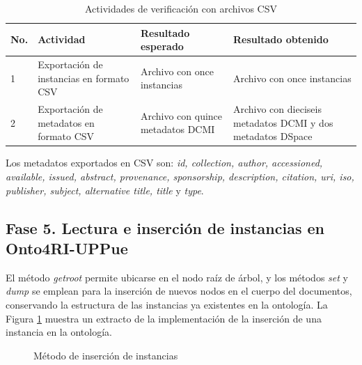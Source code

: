 \begin{table}[htbp]
    \begin{center}
    \caption{Actividades de verificaci\'on con archivos CSV}
    \begin{tabular}{| p{1.5cm}| p{3.5cm} | p{3.5cm} | p{3.5cm} |}
    \hline
    \centering \textbf{No. } & \textbf{Actividad} & \textbf{Resultado esperado} & \textbf{Resultado obtenido} \\
    \hline \hline
    1 & Exportaci\'on de instancias en formato CSV & Archivo con once instancias & Archivo con once instancias  \\ \hline
    2 & Exportaci\'on de metadatos en formato CSV  & Archivo con quince metadatos DCMI & Archivo con dieciseis metadatos DCMI y dos metadatos DSpace \\ \hline
    \end{tabular}
    \label{casosPruebaInstancias}
    \end{center}
\end{table}

Los metadatos exportados en CSV son: \textit{id, collection, author, accessioned, available, issued, abstract, provenance, sponsorship, description, citation, uri, iso, publisher, subject, alternative title, title} y \textit{type}.\newline

\subsection{Fase 5. Lectura e inserci\'on de instancias en Onto4RI-UPPue}

El m\'etodo \textit{getroot} permite ubicarse en el nodo ra\'iz de \'arbol, y los m\'etodos \textit{set} y \textit{dump} se emplean para la inserci\'on de nuevos nodos en el cuerpo del documentos, conservando la estructura de las instancias ya existentes en la ontolog\'ia. La Figura \ref{insercionInstancias} muestra un extracto de la implementaci\'on de la inserci\'on de una instancia en la ontolog\'ia.

\begin{figure}[!ht]
	\centering
    \caption{M\'etodo de inserci\'on de instancias}
    \label{insercionInstancias}
\end{figure}

